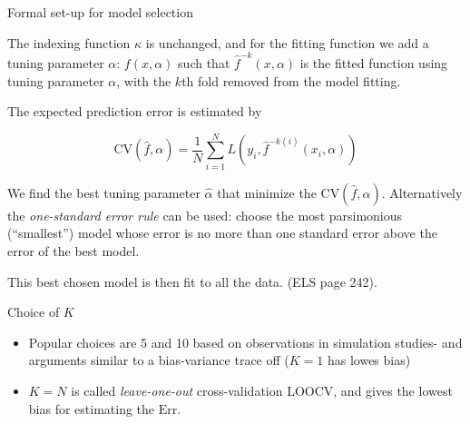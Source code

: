 \documentclass[
  ignorenonframetext,
]{beamer}
\providecommand{\tightlist}{%
  \setlength{\itemsep}{0pt}\setlength{\parskip}{0pt}}
\begin{document}
\begin{frame}

\begin{block}{Formal set-up for model selection}

The indexing function \(\kappa\) is unchanged, and for the fitting
function we add a tuning parameter \(\alpha\): \(f(x,\alpha)\) such that
\(\hat{f}^{-k}(x,\alpha)\) is the fitted function using tuning parameter
\(\alpha\), with the \(k\)th fold removed from the model fitting.

The expected prediction error is estimated by

\[ \text{CV}(\hat{f},\alpha)=\frac{1}{N}\sum_{i=1}^N L(y_i,\hat{f}^{-k(i)}(x_i,\alpha))\]

We find the best tuning parameter \(\hat{\alpha}\) that minimize the
\(\text{CV}(\hat{f},\alpha)\). Alternatively the \emph{one-standard
error rule} can be used: choose the most parsimonious (``smallest'')
model whose error is no more than one standard error above the error of
the best model.

This best chosen model is then fit to all the data. (ELS page 242).

\end{block}

\end{frame}

\begin{frame}

\begin{block}{Choice of \(K\)}

\begin{itemize}
\tightlist
\item
  Popular choices are 5 and 10 based on observations in simulation
  studies- and arguments similar to a bias-variance trace off (\(K=1\)
  has lowes bias)
\item
  \(K=N\) is called \emph{leave-one-out} cross-validation LOOCV, and
  gives the lowest bias for estimating the \(\text{Err}\).
\end{itemize}

\end{block}

\end{frame}
\end{document}
